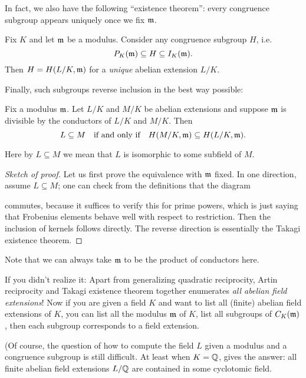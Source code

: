 In fact, we also have the following ``existence theorem'':
every congruence subgroup appears uniquely once we fix $\mathfrak m$.
\begin{theorem}
	Fix $K$ and let $\mathfrak m$ be a modulus.
	Consider any congruence subgroup $H$, i.e.\
	\[ P_K(\mathfrak m) \subseteq H \subseteq I_K(\mathfrak m). \]
	Then $H = H(L/K, \mathfrak m)$ for a \emph{unique} abelian extension $L/K$.
\end{theorem}

Finally, such subgroups reverse inclusion in the best way possible:
\begin{lemma}
	Fix a modulus $\mathfrak m$.
	Let $L/K$ and $M/K$ be abelian extensions
	and suppose $\mathfrak m$ is divisible by the conductors of $L/K$ and $M/K$.
	Then
	\[ L \subseteq M
		\quad\text{if and only if}\quad
		H(M/K, \mathfrak m) \subseteq H(L/K, \mathfrak m).  \]
\end{lemma}
Here by $L \subseteq M$ we mean that $L$ is isomorphic to some subfield of $M$.
\begin{proof}
	[Sketch of proof]
	Let us first prove the equivalence with $\mathfrak m$ fixed.
	In one direction, assume $L \subseteq M$;
	one can check from the definitions that the diagram
	\begin{center}
	\end{center}
	commutes, because it suffices to verify this for prime powers,
	which is just saying that Frobenius elements behave well
	with respect to restriction.
	Then the inclusion of kernels follows directly.
	The reverse direction is essentially the Takagi existence theorem.
\end{proof}
Note that we can always take $\mathfrak m$ to be the product of conductors here.

If you didn't realize it: Apart from generalizing quadratic reciprocity, Artin reciprocity and
Takagi existence theorem together enumerates \emph{all abelian field extensions}!
Now if you are given a field $K$ and want to list all (finite) abelian field extensions of $K$,
you can list all the modulus $\mathfrak m$ of $K$, list all subgroups of $C_K(\mathfrak m)$, then each subgroup
corresponds to a field extension.

(Of course, the question of how to compute the field $L$ given a modulus and a congruence subgroup
is still difficult. At least when $K = \mathbb Q$, \Cref{prob:kronecker_weber_theorem} gives the answer:
all finite abelian field extensions $L/\mathbb Q$ are contained in some cyclotomic field.

